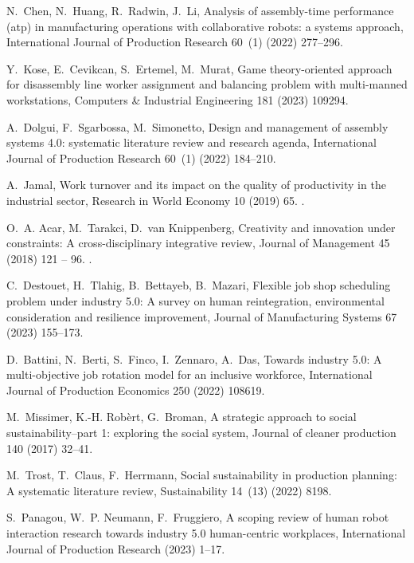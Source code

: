 \documentclass[review,12pt, 3p, times]{elsarticle}
\begin{document}
\begin{thebibliography}{10}
	N.~Chen, N.~Huang, R.~Radwin, J.~Li, Analysis of assembly-time performance
	(atp) in manufacturing operations with collaborative robots: a systems
	approach, International Journal of Production Research 60~(1) (2022)
	277--296.
	
	Y.~Kose, E.~Cevikcan, S.~Ertemel, M.~Murat, Game theory-oriented approach for
	disassembly line worker assignment and balancing problem with multi-manned
	workstations, Computers \& Industrial Engineering 181 (2023) 109294.
	
	A.~Dolgui, F.~Sgarbossa, M.~Simonetto, Design and management of assembly
	systems 4.0: systematic literature review and research agenda, International
	Journal of Production Research 60~(1) (2022) 184--210.
	
	A.~Jamal, Work turnover and its impact on the quality of productivity in the
	industrial sector, Research in World Economy 10 (2019) 65.
	\newblock \href {https://doi.org/10.5430/rwe.v10n4p65}
	{}.
	
	O.~A. Acar, M.~Tarakci, D.~van Knippenberg, Creativity and innovation under
	constraints: A cross-disciplinary integrative review, Journal of Management
	45 (2018) 121 -- 96.
	\newblock \href {https://doi.org/10.1177/0149206318805832}
	{}.
	
	C.~Destouet, H.~Tlahig, B.~Bettayeb, B.~Mazari, Flexible job shop scheduling
	problem under industry 5.0: A survey on human reintegration, environmental
	consideration and resilience improvement, Journal of Manufacturing Systems 67
	(2023) 155--173.
	
	D.~Battini, N.~Berti, S.~Finco, I.~Zennaro, A.~Das, Towards industry 5.0: A
	multi-objective job rotation model for an inclusive workforce, International
	Journal of Production Economics 250 (2022) 108619.
	
	M.~Missimer, K.-H. Rob{\`e}rt, G.~Broman, A strategic approach to social
	sustainability--part 1: exploring the social system, Journal of cleaner
	production 140 (2017) 32--41.
	
	M.~Trost, T.~Claus, F.~Herrmann, Social sustainability in production planning:
	A systematic literature review, Sustainability 14~(13) (2022) 8198.
	
	S.~Panagou, W.~P. Neumann, F.~Fruggiero, A scoping review of human robot
	interaction research towards industry 5.0 human-centric workplaces,
	International Journal of Production Research (2023) 1--17.
	

\end{thebibliography}
\end{document}
